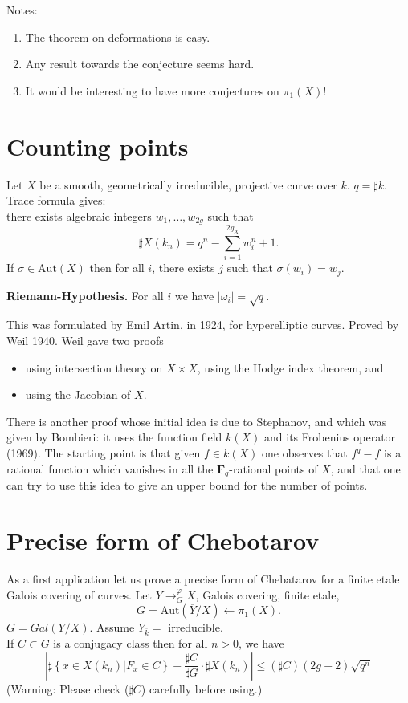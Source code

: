 \medskip\noindent
Notes:
\begin{enumerate}
\item The theorem on deformations is easy.
\item Any result towards the conjecture seems hard.
\item It would be interesting to have more conjectures on $\pi_1(X)$!
\end{enumerate}




\section{Counting points}
\label{section-counting}

\noindent
Let $X$ be a smooth, geometrically irreducible,
projective curve over $k$. $q=\sharp k$. Trace formula gives:\\
there exists algebraic integers $w_1, \ldots, w_{2g}$ such that
$$
\sharp X(k_n) = q^n-\sum_{i=1}^{2g_X}w_i^n+1.
$$
If $\sigma\in \text{Aut}(X)$ then for all $i$, there exists $j$ such that
$\sigma(w_i)=w_j$.

\medskip\noindent
{\bf Riemann-Hypothesis.} For all $i$ we have $|\omega_i| = \sqrt{q}$.

\medskip\noindent
This was formulated by Emil Artin, in 1924, for
hyperelliptic curves. Proved by Weil 1940. Weil gave two proofs
\begin{itemize}
\item using intersection theory on $X\times X$, using the
Hodge index theorem, and
\item using the Jacobian of $X$.
\end{itemize}
There is another proof whose initial idea is due to Stephanov, and
which was given by Bombieri: it uses the function field $k(X)$ and
its Frobenius operator (1969). The starting point is that given
$f\in k(X)$ one observes that $f^q - f$ is a rational function which
vanishes in all the $\mathbf{F}_q$-rational points of $X$, and that one
can try to use this idea to give an upper bound for the number of points.


\section{Precise form of Chebotarov}
\label{section-chebotarov}

\noindent
As a first application let us prove a precise form of Chebatarov
for a finite etale Galois covering of curves.
Let $Y\to^\varphi_G X$, Galois covering, finite etale,
$$
G = \text{Aut}(\overline Y/X) \leftarrow \pi_1(X).
$$
$G=Gal(Y/X)$.
Assume $Y_{\overline k} = $ irreducible. \\
If $C\subset G$ is a conjugacy class then for all $n>0$, we have
$$
\left|\sharp\left\{x\in X(k_n)\left|F_x\in
C\right.\right\}-\frac{\sharp C}{\sharp G}\cdot\sharp X(k_n)\right|\leq (\sharp
C)(2g-2)\sqrt{q^n}
$$
(Warning: Please check ($\sharp C$) carefully before using.)\\

